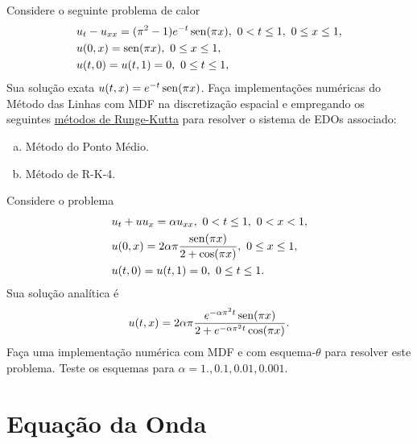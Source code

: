 \begin{exer}
  Considere o seguinte problema de calor
  \begin{subequations}
    \begin{align}
      &u_t - u_{xx} = (\pi^2 - 1)e^{-t}\operatorname{sen}(\pi x), ~0 < t \leq 1, ~0\leq x \leq 1,\\
      &u(0,x) = \operatorname{sen}(\pi x), ~0 \leq x \leq 1,\\
      &u(t,0) = u(t,1) = 0, ~ 0 \leq t \leq 1,
    \end{align}
  \end{subequations}
  Sua solução exata $u(t,x) = e^{-t}\operatorname{sen}(\pi x)$. Faça implementações numéricas do Método das Linhas com MDF na discretização espacial e empregando os seguintes \href{https://notaspedrok.com.br/notas/MatematicaNumericaII/cap_pvi_sec_rk.html}{métodos de Runge-Kutta} para resolver o sistema de EDOs associado:
  \begin{enumerate}[a)]
  \item Método do Ponto Médio.
  \item Método de R-K-4.
  \end{enumerate}
\end{exer}

\begin{exer}
  Considere o problema
  \begin{subequations}
    \begin{align}
      &u_t + uu_x = \alpha u_{xx}, ~0<t\leq 1, ~0<x<1,\\
      &u(0,x) = 2\alpha \pi\frac{\operatorname{sen}(\pi x)}{2 + \cos(\pi x)}, ~0\leq x\leq 1,\\
      &u(t,0) = u(t,1) = 0, ~0\leq t\leq 1.
    \end{align}
  \end{subequations}
  Sua solução analítica é \cite{Wood2006a}
  \begin{equation}
    u(t,x) = 2\alpha\pi\frac{e^{-\alpha\pi^2 t}\operatorname{sen}(\pi x)}{2 + e^{-\alpha\pi^2 t}\cos(\pi x)}.
  \end{equation}
  Faça uma implementação numérica com MDF e com esquema-$\theta$ para resolver este problema. Teste os esquemas para $\alpha = 1., 0.1, 0.01, 0.001$.
\end{exer}


\section{Equação da Onda}\label{cap_edp_sec_onda}

